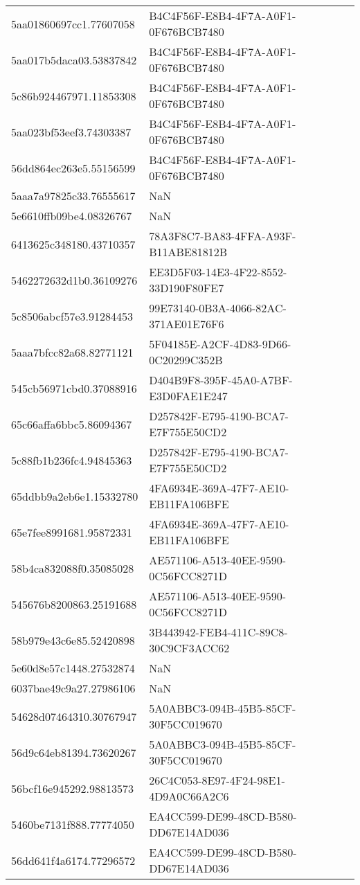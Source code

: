 \begin{tabular}{ll}
5aa01860697cc1.77607058 & B4C4F56F-E8B4-4F7A-A0F1-0F676BCB7480 \\
5aa017b5daca03.53837842 & B4C4F56F-E8B4-4F7A-A0F1-0F676BCB7480 \\
5c86b924467971.11853308 & B4C4F56F-E8B4-4F7A-A0F1-0F676BCB7480 \\
5aa023bf53eef3.74303387 & B4C4F56F-E8B4-4F7A-A0F1-0F676BCB7480 \\
56dd864ec263e5.55156599 & B4C4F56F-E8B4-4F7A-A0F1-0F676BCB7480 \\
5aaa7a97825c33.76555617 & NaN \\
5e6610ffb09be4.08326767 & NaN \\
6413625c348180.43710357 & 78A3F8C7-BA83-4FFA-A93F-B11ABE81812B \\
5462272632d1b0.36109276 & EE3D5F03-14E3-4F22-8552-33D190F80FE7 \\
5c8506abcf57e3.91284453 & 99E73140-0B3A-4066-82AC-371AE01E76F6 \\
5aaa7bfcc82a68.82771121 & 5F04185E-A2CF-4D83-9D66-0C20299C352B \\
545cb56971cbd0.37088916 & D404B9F8-395F-45A0-A7BF-E3D0FAE1E247 \\
65c66affa6bbc5.86094367 & D257842F-E795-4190-BCA7-E7F755E50CD2 \\
5c88fb1b236fc4.94845363 & D257842F-E795-4190-BCA7-E7F755E50CD2 \\
65ddbb9a2eb6e1.15332780 & 4FA6934E-369A-47F7-AE10-EB11FA106BFE \\
65e7fee8991681.95872331 & 4FA6934E-369A-47F7-AE10-EB11FA106BFE \\
58b4ca832088f0.35085028 & AE571106-A513-40EE-9590-0C56FCC8271D \\
545676b8200863.25191688 & AE571106-A513-40EE-9590-0C56FCC8271D \\
58b979e43c6e85.52420898 & 3B443942-FEB4-411C-89C8-30C9CF3ACC62 \\
5e60d8e57c1448.27532874 & NaN \\
6037bae49c9a27.27986106 & NaN \\
54628d07464310.30767947 & 5A0ABBC3-094B-45B5-85CF-30F5CC019670 \\
56d9c64eb81394.73620267 & 5A0ABBC3-094B-45B5-85CF-30F5CC019670 \\
56bcf16e945292.98813573 & 26C4C053-8E97-4F24-98E1-4D9A0C66A2C6 \\
5460be7131f888.77774050 & EA4CC599-DE99-48CD-B580-DD67E14AD036 \\
56dd641f4a6174.77296572 & EA4CC599-DE99-48CD-B580-DD67E14AD036 \\

\end{tabular}
